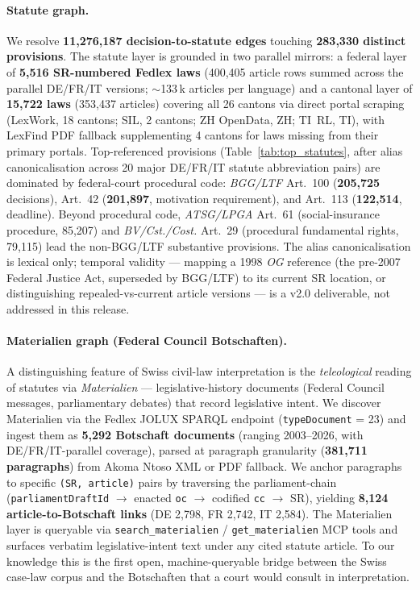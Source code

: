 \documentclass[11pt,a4paper]{article}
\begin{document}
\paragraph{Statute graph.} We resolve \textbf{11{,}276{,}187 decision-to-statute edges} touching \textbf{283{,}330 distinct provisions}. The statute layer is grounded in two parallel mirrors: a federal layer of \textbf{5{,}516 SR-numbered Fedlex laws} (400{,}405 article rows summed across the parallel DE/FR/IT versions; $\sim$133\,k articles per language) and a cantonal layer of \textbf{15{,}722 laws} (353{,}437 articles) covering all 26 cantons via direct portal scraping (LexWork, 18 cantons; SIL, 2 cantons; ZH OpenData, ZH; TI~RL, TI), with LexFind PDF fallback supplementing 4 cantons for laws missing from their primary portals. Top-referenced provisions (Table~\ref{tab:top_statutes}, after alias canonicalisation across 20 major DE/FR/IT statute abbreviation pairs) are dominated by federal-court procedural code: \emph{BGG/LTF} Art.~100 (\textbf{205{,}725} decisions), Art.~42 (\textbf{201{,}897}, motivation requirement), and Art.~113 (\textbf{122{,}514}, deadline). Beyond procedural code, \emph{ATSG/LPGA} Art.~61 (social-insurance procedure, 85{,}207) and \emph{BV/Cst./Cost.} Art.~29 (procedural fundamental rights, 79{,}115) lead the non-BGG/LTF substantive provisions. The alias canonicalisation is lexical only; temporal validity --- mapping a 1998 \emph{OG} reference (the pre-2007 Federal Justice Act, superseded by BGG/LTF) to its current SR location, or distinguishing repealed-vs-current article versions --- is a v2.0 deliverable, not addressed in this release.

\paragraph{Materialien graph (Federal Council Botschaften).} A distinguishing feature of Swiss civil-law interpretation is the \emph{teleological} reading of statutes via \emph{Materialien} --- legislative-history documents (Federal Council messages, parliamentary debates) that record legislative intent. We discover Materialien via the Fedlex JOLUX SPARQL endpoint (\texttt{typeDocument} = 23) and ingest them as \textbf{5{,}292 Botschaft documents} (ranging 2003--2026, with DE/FR/IT-parallel coverage), parsed at paragraph granularity (\textbf{381{,}711 paragraphs}) from Akoma Ntoso XML or PDF fallback. We anchor paragraphs to specific \texttt{(SR, article)} pairs by traversing the parliament-chain (\texttt{parliamentDraftId} $\to$ enacted \texttt{oc} $\to$ codified \texttt{cc} $\to$ SR), yielding \textbf{8{,}124 article-to-Botschaft links} (DE 2{,}798, FR 2{,}742, IT 2{,}584). The Materialien layer is queryable via \texttt{search\_materialien} / \texttt{get\_materialien} MCP tools and surfaces verbatim legislative-intent text under any cited statute article. To our knowledge this is the first open, machine-queryable bridge between the Swiss case-law corpus and the Botschaften that a court would consult in interpretation.
\end{document}

